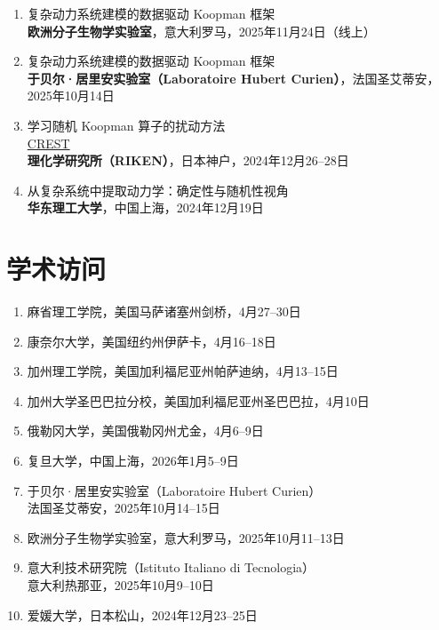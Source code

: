\documentclass[margin]{res}
\begin{document}
\begin{resume}
\begin{enumerate}
    \item 复杂动力系统建模的数据驱动 Koopman 框架\\
    \textbf{欧洲分子生物学实验室}，意大利罗马，2025年11月24日（线上）

    \item 复杂动力系统建模的数据驱动 Koopman 框架\\
    \textbf{于贝尔·居里安实验室（Laboratoire Hubert Curien）}，法国圣艾蒂安，2025年10月14日

    \item 学习随机 Koopman 算子的扰动方法\\
    \href{https://docs.google.com/spreadsheets/d/1XrgG53J6HlsHYLRHtYFsj5s32eWDr9B_/edit?gid=1512777206#gid=1512777206}{CREST}\\
    \textbf{理化学研究所（RIKEN）}，日本神户，2024年12月26--28日

    \item 从复杂系统中提取动力学：确定性与随机性视角\\
    \textbf{华东理工大学}，中国上海，2024年12月19日
\end{enumerate}

\section{学术访问}
\begin{enumerate}
    \item 麻省理工学院，美国马萨诸塞州剑桥，4月27--30日
    \item 康奈尔大学，美国纽约州伊萨卡，4月16--18日
    \item 加州理工学院，美国加利福尼亚州帕萨迪纳，4月13--15日
    \item 加州大学圣巴巴拉分校，美国加利福尼亚州圣巴巴拉，4月10日
    \item 俄勒冈大学，美国俄勒冈州尤金，4月6--9日
    \item 复旦大学，中国上海，2026年1月5--9日
    \item 于贝尔·居里安实验室（Laboratoire Hubert Curien）\\
    法国圣艾蒂安，2025年10月14--15日
    \item 欧洲分子生物学实验室，意大利罗马，2025年10月11--13日
    \item 意大利技术研究院（Istituto Italiano di Tecnologia）\\
    意大利热那亚，2025年10月9--10日
    \item 爱媛大学，日本松山，2024年12月23--25日
\end{enumerate}


\end{resume}
\end{document}
